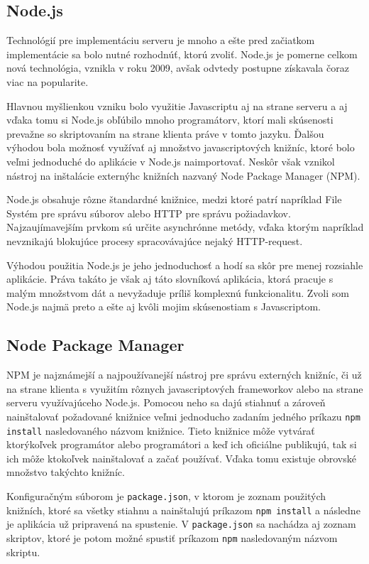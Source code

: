 \documentclass[
  digital, %
  table,   %
  lof,     %
  lot,     %
]{fithesis3}
\begin{document}
\subsection{Node.js}
Technológií pre implementáciu serveru je mnoho a ešte pred začiatkom implementácie sa bolo nutné rozhodnúť, ktorú zvoliť. Node.js je pomerne celkom nová technológia, vznikla v roku 2009, avšak odvtedy postupne získavala čoraz viac na popularite.

Hlavnou myšlienkou vzniku bolo využitie Javascriptu aj na strane serveru a aj vďaka tomu si Node.js obľúbilo mnoho programátorv, ktorí mali skúsenosti prevažne so skriptovaním na strane klienta práve v tomto jazyku. Ďalšou výhodou bola možnosť využívať aj množstvo javascriptových knižníc, ktoré bolo veľmi jednoduché do aplikácie v Node.js naimportovať. Neskôr však vznikol nástroj na inštalácie externýhc knižních nazvaný Node Package Manager (NPM).

Node.js obsahuje rôzne štandardné knižnice, medzi ktoré patrí napríklad File Systém pre správu súborov alebo HTTP pre správu požiadavkov. Najzaujímavejším prvkom sú určite asynchrónne metódy, vďaka ktorým napríklad nevznikajú blokujúce procesy spracovávajúce nejaký HTTP-request.


Výhodou použitia Node.js je jeho jednoduchosť a hodí sa skôr pre menej rozsiahle aplikácie. Práva takáto je však aj táto slovníková aplikácia, ktorá pracuje s malým množstvom dát a nevyžaduje príliš komplexnú funkcionalitu. Zvoli som Node.js najmä preto a ešte aj kvôli mojim skúsenostiam s Javascriptom.

\subsection{Node Package Manager}
NPM je najznámejší a najpoužívanejší nástroj pre správu externých knižníc, či už na strane klienta s využitím rôznych javascriptových frameworkov alebo na strane serveru využívajúceho Node.js. Pomocou neho sa dajú stiahnuť a zároveň nainštalovať požadované knižnice veľmi jednoducho zadaním jedného príkazu \texttt{npm install} nasledovaného názvom knižnice. Tieto knižnice môže vytvárať ktorýkoľvek programátor alebo programátori a keď ich oficiálne publikujú, tak si ich môže ktokoľvek nainštalovať a začať používať. Vďaka tomu existuje obrovské množstvo takýchto knižníc.

Konfiguračným súborom je \texttt{package.json}, v ktorom je zoznam použitých knižních, ktoré sa všetky stiahnu a nainštalujú príkazom \texttt{npm install} a následne je aplikácia už pripravená na spustenie. V \texttt{package.json} sa nachádza aj zoznam skriptov, ktoré je potom možné spustiť príkazom \texttt{npm} nasledovaným názvom skriptu.
\end{document}
